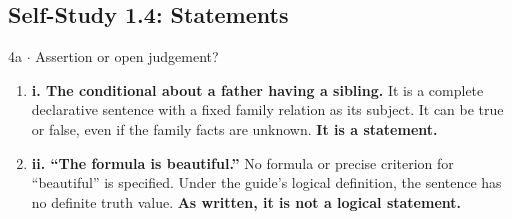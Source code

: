 \documentclass[11pt]{article}
\begin{document}
\begin{keepsection}\subsection{Self-Study 1.4: Statements}

\begin{workedbox}{4a \ensuremath{\cdot} Assertion or open judgement?}
\begin{enumerate}
\item \textbf{i. The conditional about a father having a sibling.} It is a complete declarative sentence with a fixed family relation as its subject. It can be true or false, even if the family facts are unknown. \textbf{It is a statement.}
\item \textbf{ii. “The formula is beautiful.”} No formula or precise criterion for “beautiful” is specified. Under the guide’s logical definition, the sentence has no definite truth value. \textbf{As written, it is not a logical statement.}
\end{enumerate}
\end{workedbox}

\end{keepsection}
\end{document}
